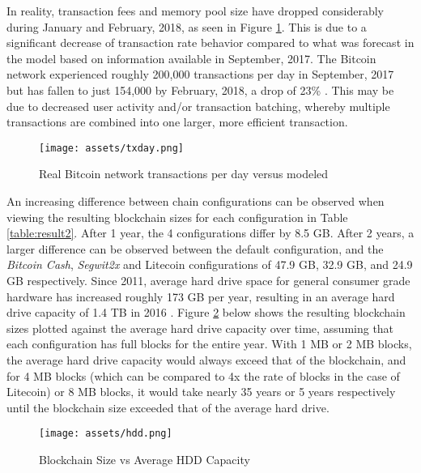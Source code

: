 \documentclass[12pt]{report}
\begin{document}
In reality, transaction fees and memory pool size have dropped considerably during January and February, 2018, as seen in Figure \ref{fig:txday}. This is due to a significant decrease of transaction rate behavior compared to what was forecast in the model based on information available in September, 2017. The Bitcoin network experienced roughly 200,000 transactions per day in September, 2017 but has fallen to just 154,000 by February, 2018, a drop of 23\% \cite{blockchain.info.}. This may be due to decreased user activity and/or transaction batching, whereby multiple transactions are combined into one larger, more efficient transaction.

\begin{figure}[h!]
\begin{center}
\texttt{[image: assets/txday.png]}
\end{center}
\caption{Real Bitcoin network transactions per day versus modeled \cite{blockchain.info.}}
\label{fig:txday}
\end{figure}

An increasing difference between chain configurations can be observed when viewing the resulting blockchain sizes for each configuration in Table \ref{table:result2}. After 1 year, the 4 configurations differ by 8.5 GB. After 2 years, a larger difference can be observed between the default configuration, and the \textit{Bitcoin Cash}, \textit{Segwit2x} and Litecoin configurations of 47.9 GB, 32.9 GB, and 24.9 GB respectively. Since 2011, average hard drive space for general consumer grade hardware has increased roughly 173 GB per year, resulting in an average hard drive capacity of 1.4 TB in 2016 \cite{AnandTech.20160512}. Figure \ref{fig:hdd} below shows the resulting blockchain sizes plotted against the average hard drive capacity over time, assuming that each configuration has full blocks for the entire year. With 1 MB or 2 MB blocks, the average hard drive capacity would always exceed that of the blockchain, and for 4 MB blocks (which can be compared to 4x the rate of blocks in the case of Litecoin) or 8 MB blocks, it would take nearly 35 years or 5 years respectively until the blockchain size exceeded that of the average hard drive.

\begin{figure}[h!]
\begin{center}
\texttt{[image: assets/hdd.png]}
\end{center}
\caption{Blockchain Size vs Average HDD Capacity}
\label{fig:hdd}
\end{figure}
\end{document}
